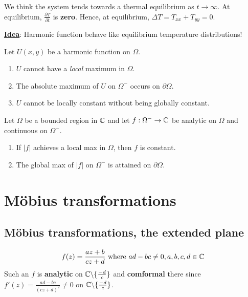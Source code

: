 \documentclass[12pt]{article}
\begin{document}
We think the system tends towards a thermal equilibrium as $t\to \infty$. At equilibrium, $\frac{\partial T}{\partial t}$ is \textbf{zero}. Hence, at equilibrium, $\Delta T=T_{xx}+T_{yy}=0$.

\textbf{\underline{Idea}}: Harmonic function behave like equilibrium temperature distributions!

\begin{proposition}
    Let $U(x,y)$ be a harmonic function on $\Omega$.
    \begin{enumerate}
        \item $U$ cannot have a \textit{local} maximum in $\Omega$.
        \item The absolute maximum of $U$ on $\Omega ^-$ occurs on $\partial \Omega$.
        \item $U$ cannot be locally constant without being globally constant.
    \end{enumerate}
\end{proposition}

\begin{theorem}
    Let $\Omega$ be a bounded region in $\mathbb{C}$ and let $f: \Omega^-\to \mathbb{C}$ be analytic on $\Omega$ and continuous on $\Omega^-$.
    \begin{enumerate}
        \item If $|f|$ achieves a local max in $\Omega$, then $f$ is constant.
        \item The global max of $|f|$ on $\Omega^-$ is attained on $\partial \Omega$.
    \end{enumerate}
\end{theorem}

\section{Möbius transformations}
\subsection{Möbius transformations, the extended plane}
\begin{align*}
    f(z)=\frac{az+b}{cz+d}\text{ where } ad-bc\neq 0, a,b,c,d\in \mathbb{C}
\end{align*}
Such an $f$ is \textbf{analytic} on $\mathbb{C}\backslash\{\frac{-d}{c}\}$ and \textbf{comformal} there since $f'(z)=\frac{ad-bc}{(cz+d)^2}\neq 0$ on $\mathbb{C}\backslash\{\frac{-d}{c}\}$.
\end{document}
